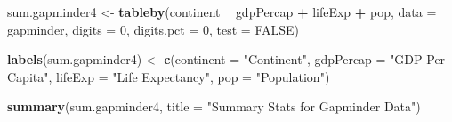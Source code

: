 \documentclass[
]{book}
\newenvironment{Shaded}{\begin{snugshade}}{\end{snugshade}}
\newcommand{\DataTypeTok}[1]{\textcolor[rgb]{0.13,0.29,0.53}{#1}}
\newcommand{\DecValTok}[1]{\textcolor[rgb]{0.00,0.00,0.81}{#1}}
\newcommand{\KeywordTok}[1]{\textcolor[rgb]{0.13,0.29,0.53}{\textbf{#1}}}
\newcommand{\NormalTok}[1]{#1}
\newcommand{\OperatorTok}[1]{\textcolor[rgb]{0.81,0.36,0.00}{\textbf{#1}}}
\newcommand{\OtherTok}[1]{\textcolor[rgb]{0.56,0.35,0.01}{#1}}
\newcommand{\StringTok}[1]{\textcolor[rgb]{0.31,0.60,0.02}{#1}}
\begin{document}
\begin{Shaded}
\begin{Highlighting}[]
\NormalTok{sum.gapminder4 <-}\StringTok{ }\KeywordTok{tableby}\NormalTok{(continent }\OperatorTok{~}\StringTok{ }\NormalTok{gdpPercap }\OperatorTok{+}\StringTok{ }\NormalTok{lifeExp }\OperatorTok{+}\StringTok{ }\NormalTok{pop, }\DataTypeTok{data =}\NormalTok{ gapminder, }\DataTypeTok{digits =} \DecValTok{0}\NormalTok{, }\DataTypeTok{digits.pct =} \DecValTok{0}\NormalTok{, }\DataTypeTok{test =} \OtherTok{FALSE}\NormalTok{)}

\KeywordTok{labels}\NormalTok{(sum.gapminder4) <-}\StringTok{ }\KeywordTok{c}\NormalTok{(}\DataTypeTok{continent =} \StringTok{"Continent"}\NormalTok{, }\DataTypeTok{gdpPercap =} \StringTok{"GDP Per Capita"}\NormalTok{, }\DataTypeTok{lifeExp =} \StringTok{"Life Expectancy"}\NormalTok{, }\DataTypeTok{pop =} \StringTok{"Population"}\NormalTok{)}
\end{Highlighting}
\end{Shaded}

\begin{Shaded}
\begin{Highlighting}[]
\KeywordTok{summary}\NormalTok{(sum.gapminder4, }\DataTypeTok{title =} \StringTok{"Summary Stats for Gapminder Data"}\NormalTok{)}
\end{Highlighting}
\end{Shaded}
\end{document}
